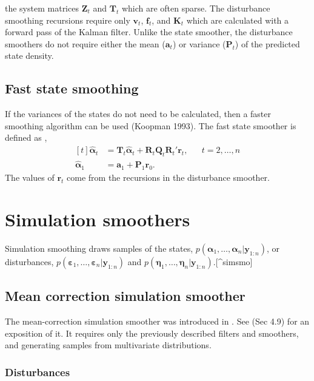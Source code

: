 \documentclass[]{book}
\newcommand{\mat}[1]{\boldsymbol{#1}}
\renewcommand{\vec}[1]{\boldsymbol{#1}}
\renewcommand{\T}{'}
\begin{document}
the system matrices \(\mat{Z}_t\) and \(\mat{T}_t\) which are often
sparse. The disturbance smoothing recursions require only \(\vec{v}_t\),
\(\mat{f}_t\), and \(\mat{K}_t\) which are calculated with a forward
pass of the Kalman filter. Unlike the state smoother, the disturbance
smoothers do not require either the mean (\(\vec{a}_t\)) or variance
(\(\mat{P}_t\)) of the predicted state density.

\subsection{Fast state smoothing}\label{fast-state-smoothing}

If the variances of the states do not need to be calculated, then a
faster smoothing algorithm can be used (Koopman 1993). The fast state
smoother is defined as \autocite[Sec 4.6.2]{DurbinKoopman2012}, \[
\begin{aligned}[t]
\hat{\vec{\alpha}}_t &= \mat{T}_t \hat{\vec{\alpha}}_t + \mat{R}_t \mat{Q}_t \mat{R}_t\T \vec{r}_t , && t = 2, \dots, n \\
\hat{\vec{\alpha}}_1 &= \vec{a}_1 + \mat{P}_1 \vec{r}_0 .
\end{aligned}
\] The values of \(\vec{r}_t\) come from the recursions in the
disturbance smoother.

\section{Simulation smoothers}\label{simulation-smoothers}

Simulation smoothing draws samples of the states,
\(p(\vec{\alpha}_1, \dots, \vec{\alpha}_n | \vec{y}_{1:n})\), or
disturbances,
\(p(\vec{\varepsilon}_1, \dots, \vec{\varepsilon}_n | \vec{y}_{1:n})\)
and
\(p(\vec{\eta}_1, \dots, \vec{\eta}_n | \vec{y}_{1:n})\).{[}\^{}simsmo{]}

\subsection{Mean correction simulation
smoother}\label{mean-correction-simulation-smoother}

The mean-correction simulation smoother was introduced in
\textcite{DurbinKoopman2002} . See \textcite{DurbinKoopman2012} (Sec
4.9) for an exposition of it. It requires only the previously described
filters and smoothers, and generating samples from multivariate
distributions.

\subsubsection{Disturbances}\label{disturbances}
\end{document}
